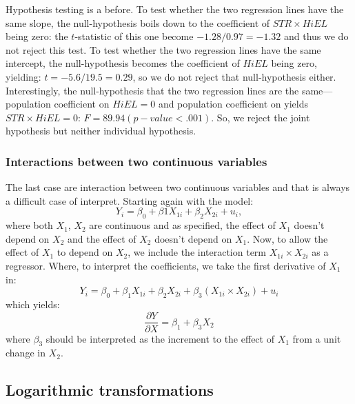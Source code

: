 \documentclass[
]{book}
\begin{document}
Hypothesis testing is a before. To test whether the two regression lines have the same slope, the null-hypothesis boils down to the coefficient of \(STR \times HiEL\) being zero: the \(t\)-statistic of this one become \(-1.28/0.97 = -1.32\) and thus we do not reject this test. To test whether the two regression lines have the same intercept, the null-hypothesis becomes the coefficient of \(HiEL\) being zero, yielding: \(t = -5.6/19.5 = 0.29\), so we do not reject that null-hypothesis either. Interestingly, the null-hypothesis that the two regression lines are the same---population coefficient on \(HiEL = 0\) and population coefficient on yields \(STR \times HiEL = 0\): \(F = 89.94 (p-value < .001)\). So, we reject the joint hypothesis but neither individual hypothesis.

\hypertarget{interactions-between-two-continuous-variables}{%
\subsubsection{Interactions between two continuous variables}\label{interactions-between-two-continuous-variables}}

The last case are interaction between two continuous variables and that is always a difficult case of interpret. Starting again with the model:
\begin{equation}
Y_i =\beta_0 + \beta1 X_{1i} +\beta_2 {X_{2i}} +u_i,
\end{equation}
where both \(X_1\), \(X_2\) are continuous and as specified, the effect of \(X_1\) doesn't depend on \(X_2\) and the effect of \(X_2\) doesn't depend on \(X_1\). Now, to allow the effect of \(X_1\) to depend on \(X_2\), we include the interaction term \(X_{1i} \times X_{2i}\) as a regressor. Where, to interpret the coefficients, we take the first derivative of \(X_1\) in:
\begin{equation}
Y_i = \beta_0 + \beta_1 X_{1i} + \beta_2 X_{2i} + \beta_3 (X_{1i}
\times X_{2i}) + u_i
\end{equation}
which yields:
\begin{equation}
\frac{\partial Y}{\partial X} = \beta_1 + \beta_3 X_2
\end{equation}
where \(\beta_3\) should be interpreted as the increment to the effect of \(X_1\) from a unit change in \(X_2\).

\hypertarget{logarithmic-transformations}{%
\subsection{Logarithmic transformations}\label{logarithmic-transformations}}
\end{document}
